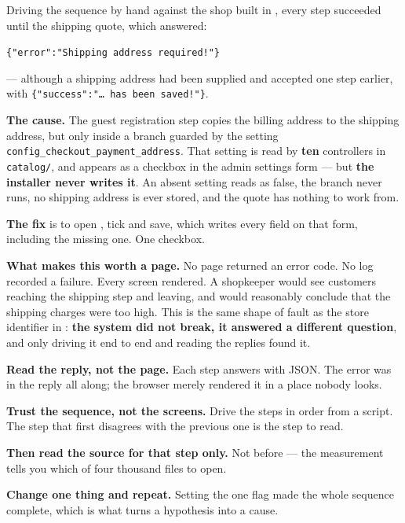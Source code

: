 \begin{alertbox}
Driving the sequence by hand against the shop built in , every
step succeeded until the shipping quote, which answered:

\smallskip
\hspace*{1em}\texttt{\{"error":"Shipping address required!"\}}

\smallskip
--- although a shipping address had been supplied and accepted one step
earlier, with \texttt{\{"success":"\dots\ has been saved!"\}}.

\smallskip
\textbf{The cause.} The guest registration step copies the billing address to
the shipping address, but only inside a branch guarded by the setting
\texttt{config\_checkout\_payment\_address}. That setting is read by
\textbf{ten} controllers in \texttt{catalog/}, and appears as a checkbox in the
admin settings form --- but \textbf{the installer never writes it}. An absent
setting reads as false, the branch never runs, no shipping address is ever
stored, and the quote has nothing to work from.

\smallskip
\textbf{The fix} is to open , tick
 and save, which writes every field on that
form, including the missing one. One checkbox.

\smallskip
\textbf{What makes this worth a page.} No page returned an error code. No log
recorded a failure. Every screen rendered. A shopkeeper would see customers
reaching the shipping step and leaving, and would reasonably conclude that the
shipping charges were too high. This is the same shape of fault as the store
identifier in : \textbf{the system did not break, it answered
a different question}, and only driving it end to end and reading the replies
found it.
\end{alertbox}

\begin{conceptbox}
\begin{tightnum}
  \item \textbf{Read the reply, not the page.} Each step answers with JSON. The
        error was in the reply all along; the browser merely rendered it in a
        place nobody looks.
  \item \textbf{Trust the sequence, not the screens.} Drive the steps in order
        from a script. The step that first disagrees with the previous one is
        the step to read.
  \item \textbf{Then read the source for that step only.} Not before --- the
        measurement tells you which of four thousand files to open.
  \item \textbf{Change one thing and repeat.} Setting the one flag made the
        whole sequence complete, which is what turns a hypothesis into a cause.
\end{tightnum}
\end{conceptbox}

